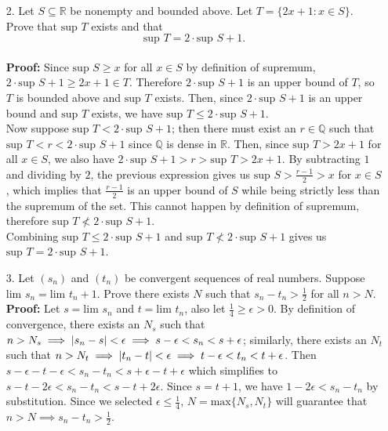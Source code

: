 \documentclass{article}
\begin{document}
\begin{itemize}
    \item [2.] Let $S\subseteq\mathbb{R}$ be nonempty and bounded above. Let $T=\{2x+1:x\in S\}$. Prove that $\text{sup }T$ exists and that \[\text{sup }T=2\cdot\text{sup }S+1.\]\\
          \textbf{Proof:} Since $\text{sup }S\geq x$ for all $x\in S$ by definition of supremum, $2\cdot\text{sup }S+1\geq 2x+1\in T$. Therefore $2\cdot\text{sup }S+1$ is an upper bound of $T$, so $T$ is bounded above and $\text{sup }T$ exists. Then, since $2\cdot\text{sup }S+1$ is an upper bound and $\text{sup }T$ exists, we have $\text{sup }T\leq 2\cdot\text{sup }S+1$.\\
          Now suppose $\text{sup }T<2\cdot\text{sup }S+1$; then there must exist an $r\in\mathbb{Q}$ such that $\text{sup }T<r<2\cdot\text{sup }S+1$ since $\mathbb{Q}$ is dense in $\mathbb{R}$. Then, since $\text{sup }T>2x+1$ for all $x\in S$, we also have $2\cdot\text{sup }S+1>r>\text{sup }T>2x+1$. By subtracting $1$ and dividing by $2$, the previous expression gives us $\text{sup }S>\frac{r-1}{2}>x$ for $x\in S$, which implies that $\frac{r-1}{2}$ is an upper bound of $S$ while being strictly less than the supremum of the set. This cannot happen by definition of supremum, therefore $\text{sup }T\nless 2\cdot\text{sup }S+1$.\\
          Combining $\text{sup }T\leq 2\cdot\text{sup }S+1$ and $\text{sup }T\nless 2\cdot\text{sup }S+1$ gives us $\text{sup }T=2\cdot\text{sup }S+1$.
\end{itemize}
\newpage
\begin{itemize}
    \item [3.] Let $(s_n)$ and $(t_n)$ be convergent sequences of real numbers. Suppose $\text{lim }s_n=\text{lim }t_n+1$. Prove there exists $N$ such that $s_n-t_n>\frac{1}{2}$ for all $n>N$.\\
          \textbf{Proof:} Let $s=\text{lim }s_n$ and $t=\text{lim }t_n$, also let $\frac{1}{4}\geq\epsilon>0$. By definition of convergence, there exists an $N_s$ such that $n>N_s\implies\abs{s_n-s}<\epsilon\implies s-\epsilon<s_n<s+\epsilon$; similarly, there exists an $N_t$ such that $n>N_t\implies\abs{t_n-t}<\epsilon\implies t-\epsilon<t_n<t+\epsilon$. Then $s-\epsilon-t-\epsilon<s_n-t_n<s+\epsilon-t+\epsilon$ which simplifies to $s-t-2\epsilon<s_n-t_n<s-t+2\epsilon$. Since $s=t+1$, we have $1-2\epsilon<s_n-t_n$ by substitution. Since we selected $\epsilon\leq\frac{1}{4}$, $N=\text{max}\{N_s,N_t\}$ will guarantee that $n>N\implies s_n-t_n>\frac{1}{2}$.
\end{itemize} 
\end{document}
